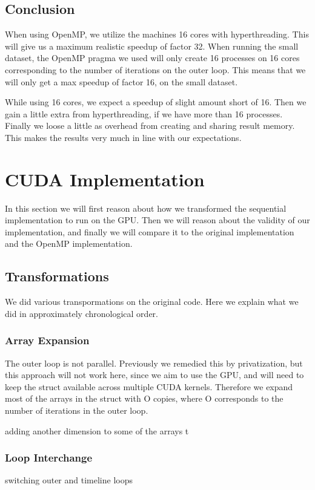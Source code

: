 \documentclass[11pt]{article}
\begin{document}
\subsection{Conclusion}
When using OpenMP, we utilize the machines 16 cores with hyperthreading. 
This will give us a maximum realistic speedup of factor 32. When running the small 
dataset, the OpenMP pragma we used will only create 16 processes on 16 cores
corresponding to the number of iterations on the outer loop. This means that 
we will only get a max speedup of factor 16, on the small dataset. 

While using 16 cores, we expect a speedup of slight amount short of 16. Then we 
gain a little extra from hyperthreading, if we have more than 16 processes. 
Finally we loose a little as overhead from creating and sharing result memory.
This makes the results very much in line with our expectations.


\section{CUDA Implementation}
In this section we will first reason about how we transformed the sequential
implementation to run on the GPU. Then we will reason about the validity of 
our implementation, and finally we will compare it to the original 
implementation and the OpenMP implementation.

\subsection{Transformations}
We did various transpormations on the original code. Here we explain what we 
did in approximately chronological order.

\subsubsection{Array Expansion}
The outer loop is not parallel. Previously we remedied this by privatization,
but this approach will not work here, since we aim to use the GPU, and will 
need to keep the struct available across multiple CUDA kernels. Therefore we
expand most of the arrays in the struct with O copies, where O corresponds to
the number of iterations in the outer loop.


adding another dimension to some of the arrays t

\subsubsection{Loop Interchange}
switching outer and timeline loops
\end{document}
